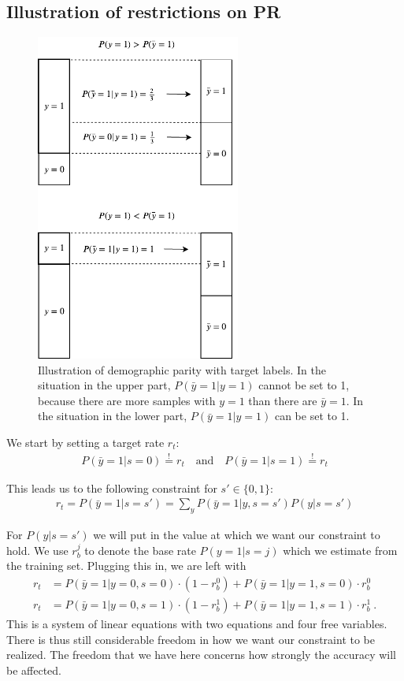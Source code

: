 \subsection{Illustration of restrictions on PR}
\begin{figure}[t]
  \centering
  \includegraphics[width=0.6\textwidth]{figures/label_shift.pdf}
  \caption{%
    Illustration of demographic parity with target labels.
    In the situation in the upper part, $P(\bar{y}=1|y=1)$ cannot be set to 1,
    because there are more samples with $y=1$ than there are $\bar{y}=1$.
    In the situation in the lower part, $P(\bar{y}=1|y=1)$ can be set to 1.
  }%
  \label{fig:shift}
\end{figure}%
We start by setting a target rate $r_t$:
\begin{align}
  P(\bar{y}=1|s=0) \overset{!}{=} r_t \quad\text{and}\quad P(\bar{y}=1|s=1) \overset{!}{=} r_t
\end{align}

This leads us to the following constraint for $s\prime\in\{0, 1\}$:
\begin{align}
  r_t = P(\bar{y}=1|s=s\prime)= \sum\limits_y P(\bar{y}=1|y,s=s\prime) P(y|s=s\prime)
\end{align}

For $P(y|s=s\prime)$ we will put in the value at which we want our constraint to hold.
We use $r_b^j$ to denote the base rate $P(y=1|s=j)$ which we estimate from the training set.
Plugging this in, we are left with
\begin{align}
  r_t &= P(\bar{y}=1|y=0,s=0) \cdot (1-r_b^0) +P(\bar{y}=1|y=1,s=0) \cdot r_b^0 \\
  r_t &= P(\bar{y}=1|y=0,s=1) \cdot (1-r_b^1) +P(\bar{y}=1|y=1,s=1) \cdot r_b^1~.
\end{align}
This is a system of linear equations with two equations and four free variables.
There is thus still considerable freedom in how we want our constraint to be realized.
The freedom that we have here concerns how strongly the accuracy will be affected.


